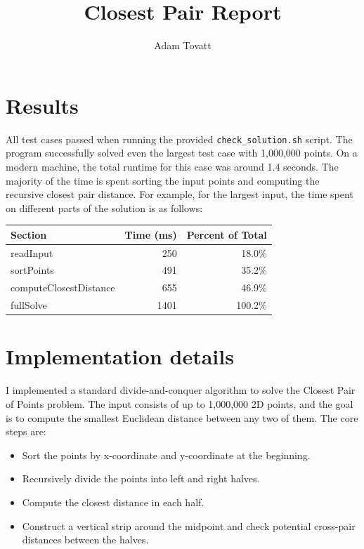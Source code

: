 \documentclass{article}
\title{Closest Pair Report}
\author{Adam Tovatt}
\begin{document}
  \maketitle

\section{Results}

All test cases passed when running the provided \texttt{check\_solution.sh} script. The program successfully solved even the largest test case with 1,000,000 points. On a modern machine, the total runtime for this case was around 1.4 seconds. The majority of the time is spent sorting the input points and computing the recursive closest pair distance. For example, for the largest input, the time spent on different parts of the solution is as follows:

\begin{tabular}{lrr}
\textbf{Section} & \textbf{Time (ms)} & \textbf{Percent of Total} \\
\hline
readInput           & 250   & 18.0\% \\
sortPoints          & 491   & 35.2\% \\
computeClosestDistance & 655   & 46.9\% \\
fullSolve           & 1401  & 100.2\% \\
\end{tabular}

\clearpage
\section{Implementation details}

I implemented a standard divide-and-conquer algorithm to solve the Closest Pair of Points problem. The input consists of up to 1,000,000 2D points, and the goal is to compute the smallest Euclidean distance between any two of them. The core steps are:

\begin{itemize}
  \item Sort the points by x-coordinate and y-coordinate at the beginning.
  \item Recursively divide the points into left and right halves.
  \item Compute the closest distance in each half.
  \item Construct a vertical strip around the midpoint and check potential cross-pair distances between the halves.
\end{itemize}
\end{document}

